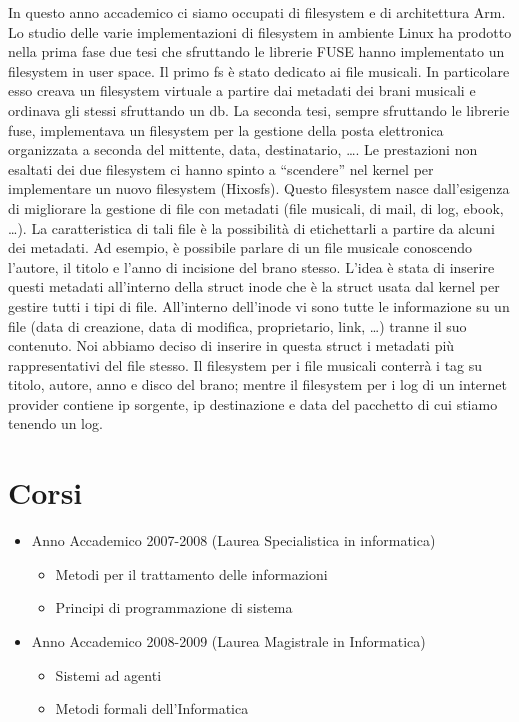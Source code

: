 \documentclass[a4paper,12pt]{article}
\newcommand{\ua }{\`{u} }
\renewcommand{\aa }{\`{a} }
\newcommand{\ea }{\`{e} }
\begin{document}
In questo anno accademico ci siamo occupati di filesystem e di architettura Arm.
Lo studio delle varie implementazioni di filesystem in ambiente Linux ha prodotto nella prima fase due tesi che sfruttando le librerie FUSE hanno implementato un filesystem in user space.
Il primo fs \ea stato dedicato ai file musicali. In particolare esso creava un filesystem virtuale a partire dai metadati dei brani musicali e ordinava gli stessi sfruttando un db. La seconda tesi, sempre sfruttando le librerie fuse, implementava un filesystem per la gestione della posta elettronica organizzata a seconda del mittente, data, destinatario, \dots.
Le prestazioni non esaltati dei due filesystem ci hanno spinto a ``scendere'' nel kernel per implementare un nuovo filesystem (Hixosfs). Questo filesystem nasce dall'esigenza di migliorare la gestione di file con metadati (file musicali, di mail, di log, ebook, \dots). La caratteristica di tali file \ea la possibilit\aa di etichettarli a partire da alcuni dei metadati. Ad esempio, \ea possibile parlare di un file musicale conoscendo l'autore, il titolo e l'anno di incisione del brano stesso. L'idea \ea stata di inserire questi metadati all'interno della struct inode che \ea la struct usata dal kernel per gestire tutti i tipi di file. All'interno dell'inode vi sono tutte le informazione su un file (data di creazione, data di modifica, proprietario, link, \dots) tranne il suo contenuto. Noi abbiamo deciso di inserire in questa struct i metadati pi\ua rappresentativi del file stesso. Il filesystem per i file musicali conterr\aa i tag su titolo, autore, anno e disco del brano; mentre il filesystem per i log di un internet provider contiene ip sorgente, ip destinazione e data del pacchetto di cui stiamo tenendo un log.






\section*{Corsi}
\begin{itemize}
\item Anno Accademico 2007-2008 (Laurea Specialistica in informatica)
\begin{itemize}
 \item Metodi per il trattamento delle informazioni
\item Principi di programmazione di sistema
\end{itemize}
\item Anno Accademico 2008-2009 (Laurea Magistrale in Informatica)
\begin{itemize}
\item Sistemi ad agenti
\item Metodi formali dell'Informatica
\end{itemize}

\end{itemize}
\end{document}

